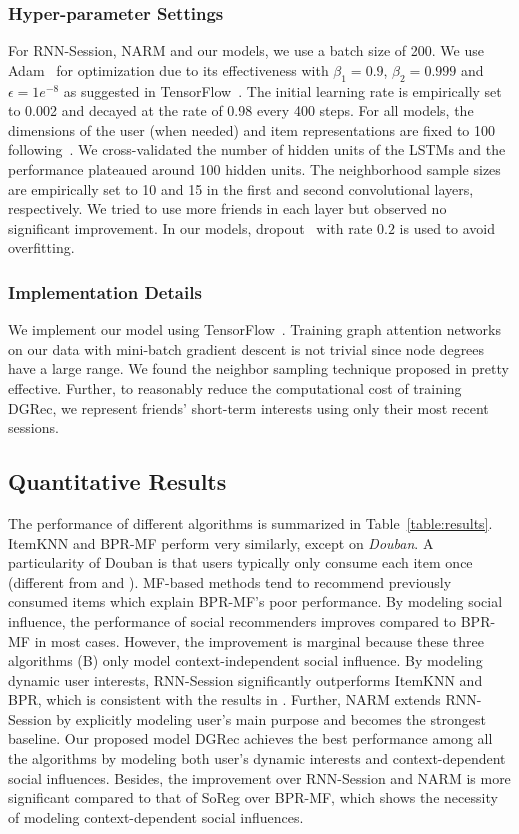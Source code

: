 \documentclass[sigconf]{acmart}
\begin{document}
\subsubsection{Hyper-parameter Settings}
For RNN-Session, NARM and our models, we use a batch size of 200. We use Adam~\cite{kingma2014adam} for optimization due to its effectiveness with $\beta_1=0.9$, $\beta_2=0.999$ and $\epsilon=1e^{-8}$ as suggested in TensorFlow~\cite{tensorflow2015-whitepaper}. The initial learning rate is empirically set to 0.002 and decayed at the rate of 0.98 every 400 steps. For all models, the dimensions of the user (when needed) and item representations are fixed to 100 following~\citet{hidasi2016session}. We cross-validated the number of hidden units of the LSTMs and the performance plateaued around 100 hidden units.
The neighborhood sample sizes are empirically set to 10 and 15 in the first and second convolutional layers, respectively. We tried to use more friends in each layer but observed no significant improvement. 
In our models, dropout~\cite{srivastava2014dropout} with rate $0.2$ is used to avoid overfitting.


\subsubsection{Implementation Details} We implement our model using TensorFlow~\cite{tensorflow2015-whitepaper}. Training graph attention networks on our data with mini-batch gradient descent is not trivial since node degrees have a large range. We found the neighbor sampling technique proposed in \cite{hamilton2017inductive} pretty effective. 
Further, to reasonably reduce the computational cost of training \gls{DGRec}, we represent friends' short-term interests using only their most recent sessions.

\subsection{Quantitative Results}\label{sec:quantitative_results}
The performance of different algorithms is summarized in Table~\ref{table:results}. ItemKNN and BPR-MF
perform very similarly, except on \textit{Douban}. 
A particularity of Douban is that users typically only consume each item once (different from  and ). MF-based methods tend to recommend previously consumed items which explain BPR-MF's poor performance.
By modeling social influence, the performance of social recommenders improves compared to BPR-MF in most cases. However, the improvement is marginal because these three algorithms (B) only model context-independent social influence. By modeling dynamic user interests, RNN-Session significantly outperforms ItemKNN and BPR, which is consistent with the results in \citet{hidasi2016session}.
Further, NARM extends RNN-Session by explicitly modeling user's main purpose and becomes the strongest baseline. Our proposed model \gls{DGRec} achieves the best performance among all the algorithms by modeling both user's dynamic interests and context-dependent social influences. Besides, the improvement over RNN-Session and NARM is more significant compared to that of SoReg over BPR-MF, which shows the necessity of modeling context-dependent social influences.
\end{document}
